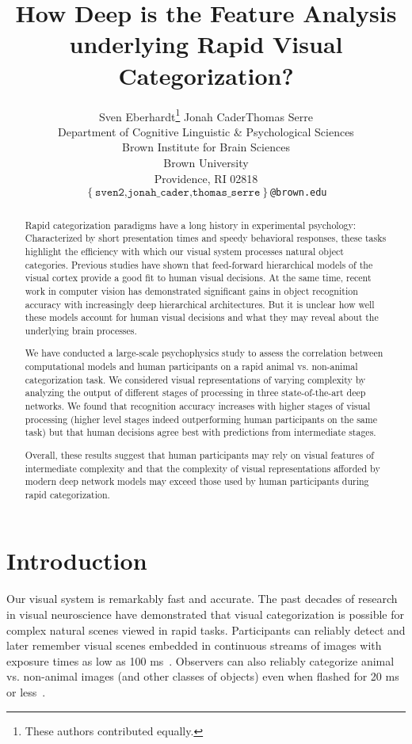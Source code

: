 \documentclass{article}
\title{How Deep is the Feature Analysis underlying Rapid Visual Categorization?}
\date{}
\author{
  Sven Eberhardt\thanks{These authors contributed equally.}  \hfill Jonah Cader\samethanks \hfill Thomas Serre\\
  Department of Cognitive Linguistic \& Psychological Sciences \\
  Brown Institute for Brain Sciences\\
  Brown University \\
  Providence, RI 02818 \\
  \texttt{$\left\{\mathrm{\texttt{sven2,jonah\_cader,thomas\_serre}}\right\}$@brown.edu}
}
\begin{document}
\maketitle

\begin{abstract}
  Rapid categorization paradigms have a long history in experimental psychology: Characterized by short presentation times and speedy behavioral responses, these tasks highlight the efficiency with which our visual system processes natural object categories. Previous studies have shown that feed-forward hierarchical models of the visual cortex provide a good fit to human visual decisions. At the same time, recent work in computer vision has demonstrated significant gains in object recognition accuracy with increasingly deep hierarchical architectures. But it is unclear how well these models account for human visual decisions and what they may reveal about the underlying brain processes.
  
  We have conducted a large-scale psychophysics study to assess the correlation between computational models and human participants on a rapid animal vs. non-animal categorization task. We considered visual representations of varying complexity by analyzing the output of different stages of processing in three state-of-the-art deep networks. We found that recognition accuracy increases with higher stages of visual processing (higher level stages indeed outperforming human participants on the same task) but that human decisions agree best with predictions from intermediate stages. 
  
  Overall, these results suggest that human participants may rely on visual features of intermediate complexity and that the complexity of visual representations afforded by modern deep network models may exceed those used by human participants during rapid categorization.\vspace{1cm}
\end{abstract}



\section{Introduction}

Our visual system is remarkably fast and accurate. The past decades of research in visual neuroscience have demonstrated that visual categorization is possible for complex natural scenes viewed in rapid tasks. Participants can reliably detect and later remember visual scenes embedded in continuous streams of images with exposure times as low as 100 ms~\citep[see][for review]{Potter2012}. Observers can also reliably categorize animal vs. non-animal images (and other classes of objects) even when flashed for 20 ms or less~\citep[see][for review]{Fabre-Thorpe2011}. 
\end{document}
